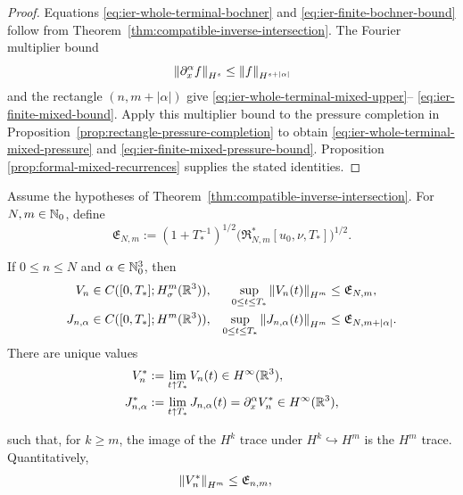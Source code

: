 \begin{proof}
Equations \eqref{eq:ier-whole-terminal-bochner} and
\eqref{eq:ier-finite-bochner-bound} follow from
Theorem~\ref{thm:compatible-inverse-intersection}.  The Fourier multiplier
bound
\[
 \left\lVert \partial_x^\alpha f\right\rVert_{H^s}
 \le\left\lVert f\right\rVert_{H^{s+|\alpha|}}
\]
and the rectangle \((n,m+|\alpha|)\) give
\eqref{eq:ier-whole-terminal-mixed-upper}--%
\eqref{eq:ier-finite-mixed-bound}.  Apply this multiplier bound to the
pressure completion in Proposition~\ref{prop:rectangle-pressure-completion}
to obtain \eqref{eq:ier-whole-terminal-mixed-pressure} and
\eqref{eq:ier-finite-mixed-pressure-bound}.  Proposition
\ref{prop:formal-mixed-recurrences} supplies the stated identities.
\end{proof}

\begin{theorem}
\label{thm:ier-compatible-endpoint-traces}
Assume the hypotheses of
Theorem~\ref{thm:compatible-inverse-intersection}.
For \(N,m\in\mathbb N_0\), define
\begin{equation}
 \mathfrak E_{N,m}
 :=(1+T_*^{-1})^{1/2}
 \bigl(\mathfrak R_{N,m}^*[u_0,\nu,T_*]\bigr)^{1/2}.
 \label{eq:ier-endpoint-majorant}
\end{equation}
\begin{samepage}
If \(0\le n\le N\) and \(\alpha\in\mathbb N_0^3\), then
\begin{align}
 V_n&\in C([0,T_*];H^m_\sigma(\mathbb R^3)),
 &\sup_{0\le t\le T_*}\left\lVert V_n(t)\right\rVert_{H^m}
 &\le\mathfrak E_{N,m},
 \label{eq:ier-row-trace}\\
 J_{n,\alpha}&\in C([0,T_*];H^m(\mathbb R^3)),
 &\sup_{0\le t\le T_*}\left\lVert J_{n,\alpha}(t)\right\rVert_{H^m}
 &\le\mathfrak E_{N,m+|\alpha|}.
 \label{eq:ier-mixed-row-trace}
\end{align}
There are unique values
\begin{align}
 V_n^*&:=\lim_{t\uparrow T_*}V_n(t)
 \in H^\infty(\mathbb R^3),
 \label{eq:ier-velocity-endpoint}\\
 J_{n,\alpha}^*&:=\lim_{t\uparrow T_*}J_{n,\alpha}(t)
 =\partial_x^\alpha V_n^*
 \in H^\infty(\mathbb R^3),
 \label{eq:ier-mixed-velocity-endpoint}
\end{align}
\par
\end{samepage}
such that, for \(k\ge m\), the image of the \(H^k\) trace under
\(H^k\hookrightarrow H^m\) is the \(H^m\) trace.  Quantitatively,
\begin{align}
 \norm{V_n^*}_{H^m}
 &\le\mathfrak E_{n,m},

\end{align}
\end{theorem}
